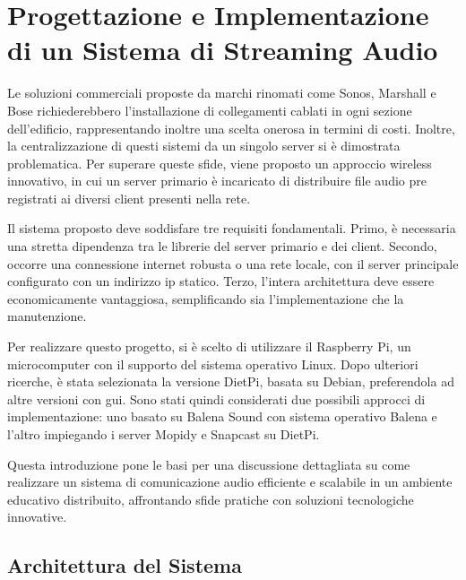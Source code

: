 
%

\chapter{Progettazione e Implementazione di un Sistema di Streaming Audio}
\label{cha:streamingaudio}


Le soluzioni commerciali proposte da marchi rinomati come Sonos, Marshall e Bose richiederebbero l'installazione di collegamenti cablati in ogni sezione dell'edificio, rappresentando inoltre una scelta onerosa in termini di costi. Inoltre, la centralizzazione di questi sistemi da un singolo server si è dimostrata problematica. Per superare queste sfide, viene proposto un approccio wireless innovativo, in cui un server primario è incaricato di distribuire file audio pre registrati ai diversi client presenti nella rete.

Il sistema proposto deve soddisfare tre requisiti fondamentali. Primo, è necessaria una stretta dipendenza tra le librerie del server primario e dei client. Secondo, occorre una connessione internet robusta o una rete locale, con il server principale configurato con un indirizzo \gls{ip} statico. Terzo, l'intera architettura deve essere economicamente vantaggiosa, semplificando sia l'implementazione che la manutenzione.

Per realizzare questo progetto, si è scelto di utilizzare il Raspberry Pi, un microcomputer con il supporto del sistema operativo Linux. Dopo ulteriori ricerche, è stata selezionata la versione DietPi, basata su Debian, preferendola ad altre versioni con \gls{gui}. Sono stati quindi considerati due possibili approcci di implementazione: uno basato su Balena Sound con sistema operativo Balena e l'altro impiegando i server Mopidy e Snapcast su DietPi.

Questa introduzione pone le basi per una discussione dettagliata su come realizzare un sistema di comunicazione audio efficiente e scalabile in un ambiente educativo distribuito, affrontando sfide pratiche con soluzioni tecnologiche innovative.

\newpage
\section{Architettura del Sistema}
\noindent

